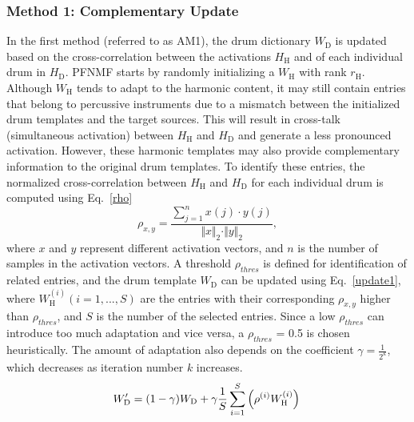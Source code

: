 \documentclass{article}
\begin{document}
\subsubsection{Method 1: Complementary Update}\label{subsubsec:method1}
In the first method (referred to as AM1), the drum dictionary $W_\mathrm{D}$  is updated based on the cross-correlation between the activations $H_\mathrm{H}$  and of each individual drum in $H_\mathrm{D}$. PFNMF starts by randomly initializing a $W_\mathrm{H}$ with rank $r_\mathrm{H}$. Although $W_\mathrm{H}$ tends to adapt to the harmonic content, it may still contain entries that belong to percussive instruments due to a mismatch between the initialized drum templates and the target sources. This will result in cross-talk (simultaneous activation) between $H_\mathrm{H}$ and $H_\mathrm{D}$ and generate a less pronounced activation. However, these harmonic templates may also provide complementary information to the original drum templates. To identify these entries, the normalized cross-correlation between $H_\mathrm{H}$ and $H_\mathrm{D}$ for each individual drum is computed using Eq.~\eqref{rho}
\begin{equation}\label{rho}
\rho_{x, y} = \frac{\sum_{j=1}^n x(j)\cdot y(j)}{\Vert x \Vert_2 \cdot \Vert y \Vert_2},
\end{equation}    
where $x$ and $y$ represent different activation vectors, and $n$ is the number of samples in the activation vectors. A threshold $\rho_{thres}$ is defined for identification of related entries, and the drum template $W_\mathrm{D}$ can be updated using Eq.~\eqref{update1}, where $W_\mathrm{H}^{(i)} (i = 1, ..., S)$ are the entries with their corresponding $\rho_{x, y}$ higher than $\rho_{thres}$, and $S$ is the number of the selected entries. Since a low $\rho_{thres}$ can introduce too much adaptation and vice versa, a $\rho_{thres}$ = 0.5 is chosen heuristically. The amount of adaptation also depends on the coefficient $\gamma = \frac{1}{2^{k}}$, which decreases as iteration number $k$ increases. 
%
\begin{equation}
\label{update1}
W_\mathrm{D}^{\prime} = (1 - \gamma) W_\mathrm{D} + \gamma \frac{1}{S} \sum_{i=1}^S\left(\rho^{(i)} W_\mathrm{H}^{(i)}\right)\\
\end{equation}
\end{document}
